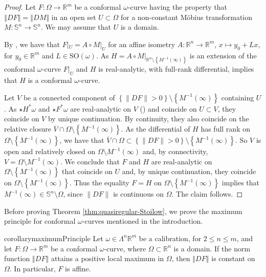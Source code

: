\documentclass[a4paper,leqno,11pt]{amsart}
\numberwithin{equation}{section}
\theoremstyle{remark}
\theoremstyle{remark}
\renewcommand{\S}{\mathbb{S}}
\newcommand{\R}{\mathbb{R}}
\newcommand{\norm}[1]{ \left\Vert #1 \right\Vert }	%
\newcommand{\SO}{\mathrm{SO}}
\begin{document}
\begin{proof}
Let $F \colon \Omega \rightarrow \R^m$ be a conformal $\omega$-curve having the property that $\norm{DF} = \norm{DM}$ in an open set $U \subset \Omega$ for a non-constant Möbius transformation $M \colon \S^n \to \S^n$. We may assume that $U$ is a domain. 

By , we have that $F|_{U} = A \circ M|_{U}$ for an affine isometry $A \colon \R^n \to \R^m$, $x\mapsto y_0 + Lx$, for $y_0\in \R^m$ and $L \in \SO(\omega)$. As $H = A \circ M|_{ \R^n \setminus \left\{ M^{-1}( \infty ) \right\} }$ is an extension of the conformal $\omega$-curve $F|_{U}$ and $H$ is real-analytic, with full-rank differential,  implies that $H$ is a conformal $\omega$-curve.

Let $V$ be a connected component of $\left\{ \|DF\| > 0 \right\} \setminus \left\{ M^{-1}(\infty) \right\}$ containing $U$. As $\star H^{*}\omega$ and $\star F^{*}\omega$ are real-analytic on $V$ () and coincide on $U \subset V$, they coincide on $V$ by unique continuation. By continuity, they also coincide on the relative closure $\overline{V} \cap \Omega \setminus \left\{ M^{-1}(\infty) \right\}$. As the differential of $H$ has full rank on $\Omega \setminus \left\{ M^{-1}(\infty) \right\}$, we have that $\overline{V} \cap \Omega \subset \left\{ \|DF\| > 0 \right\} \setminus \left\{ M^{-1}(\infty) \right\}$. So $V$ is open and relatively closed on $\Omega \setminus M^{-1}( \infty )$ and, by connectivity, $V = \Omega \setminus M^{-1}( \infty )$. We conclude that $F$ and $H$ are real-analytic on $\Omega \setminus \left\{ M^{-1}(\infty) \right\}$ that coincide on $U$ and, by unique continuation, they coincide on $\Omega \setminus \left\{ M^{-1}(\infty) \right\}$. Thus the equality $F = H$ on $\Omega \setminus \left\{ M^{-1}(\infty) \right\}$ implies that $M^{-1}( \infty ) \in \S^n \setminus \Omega$, since $\|DF\|$ is continuous on $\Omega$. The claim follows.
\end{proof}




Before proving Theorem \ref{thm:quasiregular-Stoilow}, we prove the maximum principle for conformal $\omega$-curves mentioned in the introduction.

\begin{restatable}
{corollary}{maximumPrinciple}
\label{cor:Maximum-principle}    
Let $\omega \in \Lambda^n \R^m$ be a calibration, for $2 \leq n \leq m$, and let $F\colon \Omega \to \R^m$ be a conformal $\omega$-curve, where $\Omega \subset \R^n$ is a domain. If the norm function $\norm{DF}$ attains a positive local maximum in $\Omega$, then $\norm{DF}$ is constant on $\Omega$. In particular, $F$ is affine.
\end{restatable}
\end{document}
